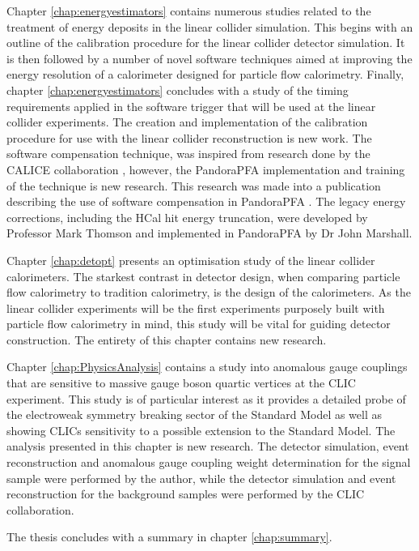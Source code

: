 Chapter \ref{chap:energyestimators} contains numerous studies related to the treatment of energy deposits in the linear collider simulation.  This begins with an outline of the calibration procedure for the linear collider detector simulation.  It is then followed by a number of novel software techniques aimed at improving the energy resolution of a calorimeter designed for particle flow calorimetry.  Finally, chapter \ref{chap:energyestimators} concludes with a study of the timing requirements applied in the software trigger that will be used at the linear collider experiments.  {The creation and implementation of the calibration procedure for use with the linear collider reconstruction is new work.  The software compensation technique, was inspired from research done by the CALICE collaboration \cite{Adloff:2012gv}, however, the PandoraPFA implementation and training of the technique is new research.  This research was made into a publication describing the use of software compensation in PandoraPFA \cite{Tran:2017tgr}.  The legacy energy corrections, including the HCal hit energy truncation, were developed by Professor Mark Thomson and implemented in PandoraPFA by Dr John Marshall.}  

Chapter \ref{chap:detopt} presents an optimisation study of the linear collider calorimeters.  The starkest contrast in detector design, when comparing particle flow calorimetry to tradition calorimetry, is the design of the calorimeters.  As the linear collider experiments will be the first experiments {purposely} built with particle flow calorimetry in mind, this study will be vital for guiding detector construction.  The entirety of this chapter contains new research.

Chapter \ref{chap:PhysicsAnalysis} contains a study into anomalous gauge couplings that are sensitive to massive gauge boson quartic vertices at the CLIC experiment.  This study is of particular interest as it provides a detailed probe of the electroweak symmetry breaking sector of the Standard Model as well as showing CLICs sensitivity to a possible extension to the Standard Model.  The analysis presented in this chapter is new research.  The detector simulation, event reconstruction and anomalous gauge coupling weight determination for the signal sample were performed by the author, while the detector simulation and event reconstruction for the background samples were performed by the CLIC collaboration.
  
The thesis concludes with a summary in chapter \ref{chap:summary}.

